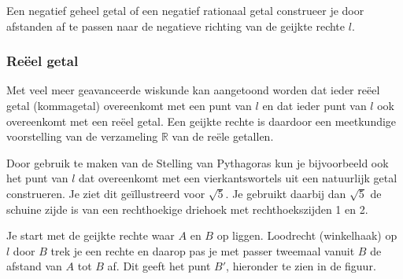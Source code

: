 
Een negatief geheel getal of een negatief rationaal getal construeer je door afstanden af te passen naar de negatieve richting van de geijkte rechte $l$.

\subsubsection{Re\"eel getal}

Met veel meer geavanceerde wiskunde kan aangetoond worden dat ieder re\"eel getal (kommagetal) overeenkomt met een punt van $l$ en dat ieder punt van $l$ ook overeenkomt met een re\"eel getal. Een geijkte rechte is daardoor een meetkundige voorstelling van de verzameling $\mathbb{R}$ van de re\"ele getallen.\vspace{2mm}

Door gebruik te maken van de Stelling van Pythagoras kun je bijvoorbeeld ook het punt van $l$ dat overeenkomt met een vierkantswortels uit een natuurlijk getal construeren.
Je ziet dit ge\"illustreerd voor $\sqrt{5}$.
Je gebruikt daarbij dan $\sqrt{5}$ de schuine zijde is van een rechthoekige driehoek met rechthoekszijden 1 en 2.\vspace{5mm}

Je start met de geijkte rechte waar $A$ en $B$ op liggen.
Loodrecht (winkelhaak) op $l$ door $B$ trek je een rechte en daarop pas je met passer tweemaal vanuit $B$ de afstand van $A$ tot $B$ af.
Dit geeft het punt $B'$, hieronder te zien in de figuur.

\begin{center}
\end{center}

